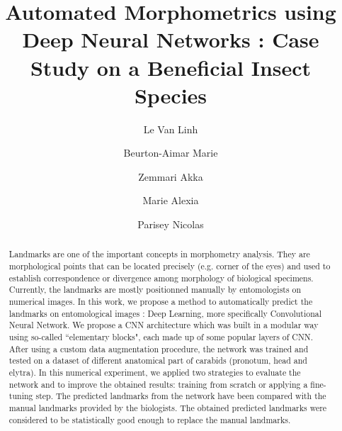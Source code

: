 \documentclass[review]{elsarticle}
\begin{document}
\begin{frontmatter}

  \title{Automated Morphometrics using Deep Neural Networks : Case Study on a Beneficial Insect Species}




\author[labri,inria]{Le Van Linh}
\author[labri]{Beurton-Aimar Marie}
\author[labri]{Zemmari Akka}
\author[igepp]{Marie Alexia}
\author[igepp]{Parisey Nicolas}


\address[labri]{LaBRI - University of Bordeaux, UMR 5800, 351, cours de la Liberation, 33405 Talence, France}
\address[igepp]{UMR 1349 IGEPP, BP 35327, 35653 Le Rheu, France}
\address[inria]{INRIA Bordeaux Sud-Ouest, 200, avenue de la Vieille Tour, 33405 Talence, France}


\begin{abstract}
Landmarks are one of the important concepts in morphometry analysis. They are morphological points that can be located precisely (e.g. corner of the eyes) and used to establish correspondence or divergence among morphology of biological specimens. Currently, the landmarks are mostly positionned manually by entomologists on numerical images.
In this work, we propose a method to automatically predict the landmarks on entomological images : Deep Learning, more specifically Convolutional Neural Network. We propose a CNN architecture which was built in a modular way using so-called ``elementary blocks", each made up of some popular layers of CNN. After using a custom data augmentation procedure, 
the network was trained and tested on a dataset of different anatomical part of carabids (pronotum, head and elytra). In this numerical experiment, we applied two strategies to evaluate the network and to improve the obtained results: training from scratch or applying a fine-tuning step. The predicted landmarks from the network have been compared with the manual landmarks provided by the biologists. The obtained predicted landmarks were considered to be statistically good enough to replace the manual landmarks.
\end{abstract}


\end{frontmatter}
\end{document}
